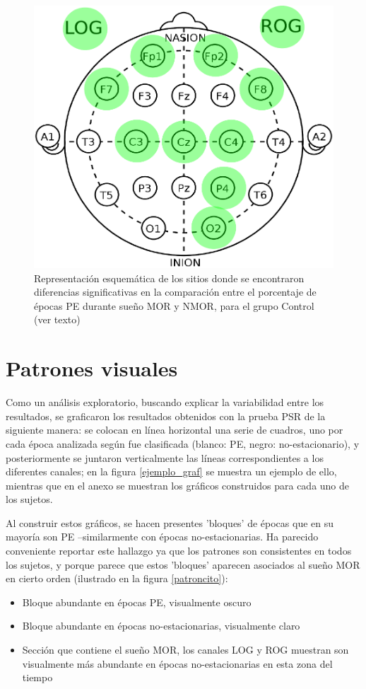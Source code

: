 \documentclass[12pt,a4paper]{mitthesis}
\begin{document}
\begin{figure}
\centering
\includegraphics[width=0.4\linewidth]
{cabecita.pdf} 
\caption{Representaci\'on esquem\'atica de los sitios donde se encontraron diferencias 
significativas en la comparaci\'on entre el porcentaje de \'epocas PE durante sue\~no MOR y NMOR, 
para el grupo Control (ver texto)}
\label{cabecita}
\end{figure}


\section{Patrones visuales}

Como un an\'alisis exploratorio, buscando explicar la variabilidad entre los resultados, se 
graficaron los resultados obtenidos con la prueba PSR de la siguiente manera: se colocan en 
l\'inea horizontal una serie de cuadros, uno por cada \'epoca analizada seg\'un fue clasificada 
(blanco: PE, negro: no-estacionario), y posteriormente se juntaron verticalmente las l\'ineas
correspondientes a los diferentes canales; en la figura \ref{ejemplo_graf} se muestra un ejemplo de
ello, mientras que en el anexo se muestran los gr\'aficos construidos para cada uno de los sujetos. 

Al construir estos gr\'aficos, se hacen presentes 'bloques' de \'epocas que en su mayor\'ia son
PE --similarmente con \'epocas no-estacionarias. Ha parecido conveniente reportar este hallazgo
ya que los patrones son consistentes en todos los sujetos, y porque parece que estos 'bloques'
aparecen asociados al sue\~no MOR en cierto orden (ilustrado en la figura \ref{patroncito}):
\begin{itemize}
\item Bloque abundante en \'epocas PE, visualmente oscuro
\item Bloque abundante en \'epocas no-estacionarias, visualmente claro
\item Secci\'on que contiene el sue\~no MOR, los canales LOG y ROG muestran son visualmente m\'as
abundante en \'epocas no-estacionarias en esta zona del tiempo
\end{itemize}
\end{document}
